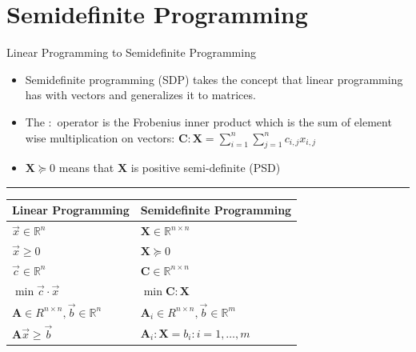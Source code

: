 \documentclass[
	11pt, %
]{beamer}
\begin{document}
\section{Semidefinite Programming}
\begin{frame}[label={sec:org73100b6}]{Linear Programming to Semidefinite Programming}
\begin{itemize}
\item Semidefinite programming (SDP) takes the concept that linear programming has
with vectors and generalizes it to matrices.
\end{itemize}

\begin{itemize}
\item The \( : \) operator is the Frobenius inner product which is the sum of element wise multiplication on vectors:
\( \mathbf{C} : \mathbf{X} = \sum_{i = 1}^n \sum_{j = 1}^n c_{i, j} x_{i, j} \)
\item \( \mathbf{X} \succeq 0 \) means that \( \mathbf{X} \) is positive semi-definite (PSD)
\end{itemize}
\noindent\rule{\textwidth}{0.5pt}
\begin{center}
\begin{tabular}{ll}
Linear Programming & Semidefinite Programming\\[0pt]
\hline
\(\vec{x} \in \mathbb{R}^n\) & \(\mathbf{X} \in \mathbb{R}^{n \times n}\)\\[0pt]
\(\vec{x} \geq 0\) & \(\mathbf{X} \succeq 0\)\\[0pt]
\(\vec{c} \in \mathbb{R}^n\) & \(\mathbf{C} \in \mathbb{R}^{n \times n}\)\\[0pt]
\(\min \vec{c} \cdot \vec{x}\) & \(\min \mathbf{C} : \mathbf{X}\)\\[0pt]
\(\mathbf{A} \in R^{n \times n}, \vec{b} \in \mathbb{R}^n\) & \(\mathbf{A}_{i} \in R^{n \times n}, \vec{b} \in \mathbb{R}^m\)\\[0pt]
\(\mathbf{A} \vec{x} \geq \vec{b}\) & \(\mathbf{A}_i : \mathbf{X} = b_i : i = 1, \ldots, m\)\\[0pt]
\end{tabular}
\end{center}
\end{frame}
\end{document}
